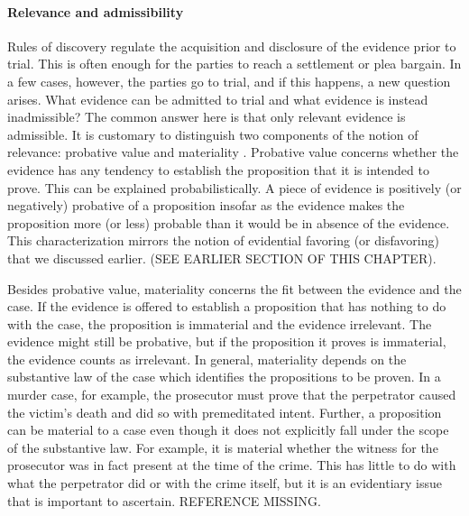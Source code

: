 \documentclass[10pt]{article}
\begin{document}



\paragraph{Relevance and admissibility}


Rules of discovery regulate the acquisition and disclosure 
of the evidence prior to trial. This is often enough for the parties to reach 
a settlement or plea bargain. In a few cases, however, the parties go to trial, and 
if this happens, a new question arises. What evidence can be admitted to trial and what evidence is instead inadmissible? 
The common answer here is that only relevant evidence is admissible.
It is customary to distinguish two components of the notion of relevance: probative value and materiality
 \citep{Fisher2008Evidence, Mendez2008}. Probative value concerns whether the evidence has any tendency to establish the proposition that it is intended to prove. This can be explained probabilistically. A piece of evidence is positively (or negatively) probative of a proposition insofar as the evidence makes the proposition more (or less) probable than it would be in absence of the evidence. This characterization mirrors the notion 
of evidential favoring (or disfavoring) that we discussed earlier. (SEE EARLIER SECTION OF THIS CHAPTER). 

Besides probative value, materiality concerns the fit between the evidence and the case. If the evidence is offered to establish a proposition that has nothing to do with the case, the proposition is immaterial and the evidence irrelevant. The evidence might still be probative, 
but if the proposition it proves is immaterial, the evidence counts as irrelevant. In general, materiality depends on the substantive law of the case which identifies the propositions to be proven. In a murder case, for example, the prosecutor must prove that the perpetrator caused the 
victim's death and did so with premeditated intent. Further, a proposition can be material to a case even though it does not explicitly fall under 
the scope of the substantive law. For example, it is material whether the witness for the prosecutor was in fact present at the time of the crime. This has little to do with what the perpetrator did or with the crime itself, but it is an evidentiary issue that is important to ascertain.  
REFERENCE MISSING.  
\end{document}
